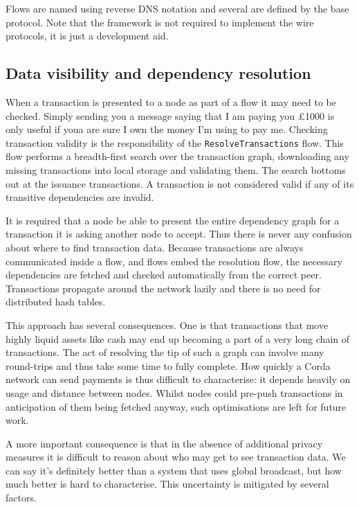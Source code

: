 \documentclass{article}
\begin{document}
Flows are named using reverse DNS notation and several are defined by the base protocol. Note that the framework is
not required to implement the wire protocols, it is just a development aid.

\subsection{Data visibility and dependency resolution}

When a transaction is presented to a node as part of a flow it may need to be checked. Simply sending you
a message saying that I am paying you \pounds1000 is only useful if youa are sure I own the money I'm using to pay me.
Checking transaction validity is the responsibility of the \texttt{ResolveTransactions} flow. This flow performs
a breadth-first search over the transaction graph, downloading any missing transactions into local storage and
validating them. The search bottoms out at the issuance transactions. A transaction is not considered valid if
any of its transitive dependencies are invalid.

It is required that a node be able to present the entire dependency graph for a transaction it is asking another
node to accept. Thus there is never any confusion about where to find transaction data. Because transactions are
always communicated inside a flow, and flows embed the resolution flow, the necessary dependencies are fetched
and checked automatically from the correct peer. Transactions propagate around the network lazily and there is
no need for distributed hash tables.

This approach has several consequences. One is that transactions that move highly liquid assets like cash may
end up becoming a part of a very long chain of transactions. The act of resolving the tip of such a graph can
involve many round-trips and thus take some time to fully complete. How quickly a Corda network can send payments
is thus difficult to characterise: it depends heavily on usage and distance between nodes. Whilst nodes could
pre-push transactions in anticipation of them being fetched anyway, such optimisations are left for future work.

A more important consequence is that in the absence of additional privacy measures it is difficult to reason
about who may get to see transaction data. We can say it's definitely better than a system that uses global
broadcast, but how much better is hard to characterise. This uncertainty is mitigated by several factors.
\end{document}
